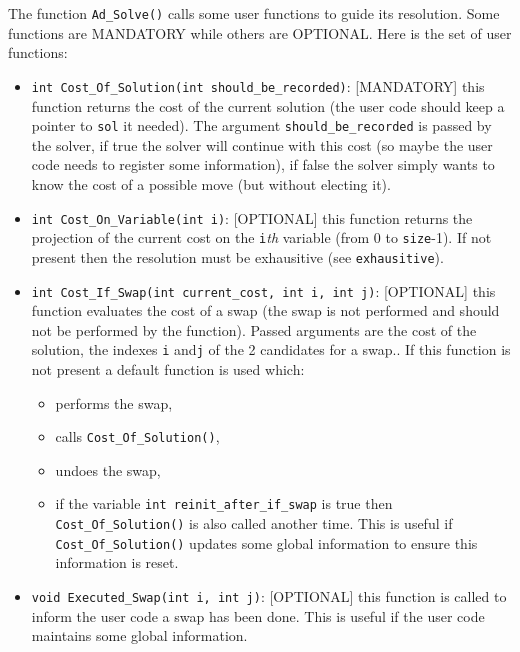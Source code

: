 \documentclass{article}
\begin{document}
The function \texttt{Ad\_Solve()} calls some user functions to guide its
resolution. Some functions are MANDATORY while others are OPTIONAL. Here is
the set of user functions:

\begin{itemize}

\item \texttt{int Cost\_Of\_Solution(int should\_be\_recorded)}: [MANDATORY]
  this function returns the cost of the current solution (the user code
  should keep a pointer to \texttt{sol} it needed). The argument
  \texttt{should\_be\_recorded} is passed by the solver, if true the solver
  will continue with this cost (so maybe the user code needs to register some
  information), if false the solver simply wants to know the cost of a
  possible move (but without electing it).

\item \texttt{int Cost\_On\_Variable(int i)}: [OPTIONAL] this function
 returns the projection of the current cost on the \texttt{i}\textit{th}
 variable (from 0 to \texttt{size}-1). If not present then the
 resolution must be exhausitive (see \texttt{exhausitive}).

\item \texttt{int Cost\_If\_Swap(int current\_cost, int i, int j)}: [OPTIONAL]
  this function evaluates the cost of a swap (the swap is not performed and
  should not be performed by the function). Passed arguments are the cost of
  the solution, the indexes \texttt{i} and\texttt{j} of the 2 candidates for
  a swap.. If this function is not present a default function is used which:
 \begin{itemize}

   \item performs the swap, 

   \item calls \texttt{Cost\_Of\_Solution()},

   \item undoes the swap,

   \item if the variable \texttt{int reinit\_after\_if\_swap} is true
         then \texttt{Cost\_Of\_Solution()} is also called another time. This
         is useful if \texttt{Cost\_Of\_Solution()} updates some global
         information to ensure this information is reset.
 \end{itemize}

\item \texttt{void Executed\_Swap(int i, int j)}: [OPTIONAL] this function is
 called to inform the user code a swap has been done. This is useful if the
 user code maintains some global information.


\end{itemize}
\end{document}
